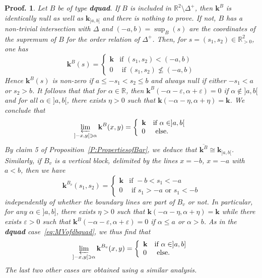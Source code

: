 \documentclass[a4paper, english, 11pt]{article}
\newcommand{\kk}[0]{\textbf{k}}
\newcommand{\0}{\vec{0}}
\newtheorem*{pf}{Proof.} }
\begin{document}
\begin{pf}
Let $B$ be of type \textbf{dquad}. If $B$ is included in $\mathbb{R}^2\setminus \Delta^+$, then $\kk^B$ is identically null as well as $\kk_{]a,b[}$ and there is nothing to prove. If not, $B$ has a non-trivial intersection with $\Delta$ and   $(-a,b)=\sup_{B}(s)$ are the coordinates of the supremum of $B$ for the order relation of $\Delta^+$. Then, for  $s=(s_1,s_2)\in \mathbb{R}^2_{>0}$, one has 
$$\kk^B(s) =\left\{ \begin{array}{ll} \kk & \mbox{if } (s_1,s_2)< (-a,b) \\
0 & \mbox{ if } (s_1, s_2) \not\leqslant (-a,b)\end{array}\right . $$ 
Hence $\kk^B(s)$ is non-zero  if $ a\leq -s_1 <s_2 \leq b$ and always null if either $-s_1<a$ or $s_2 >b$. It follows that 
that for $\alpha \in \mathbb{R}$, then $ \kk^B(-\alpha-\varepsilon, \alpha+\varepsilon) =0$ 
if $\alpha \notin ]a,b[$ and for all $\alpha \in ]a,b[$, there exists $\eta >0$ such that 
$\kk(-\alpha -\eta, \alpha+\eta) =\kk$. We conclude that
\begin{equation}\label{eq:MVofdbquad}\varprojlim_{]-x, y[ \ni \alpha} \kk^B(x,y) = \left\{ \begin{array}{ll} \kk & \mbox{if } \alpha \in ]a,b[ \\
0 & \mbox{ else. }\end{array}\right . 
 \end{equation}
By claim 5 of Proposition~\ref{P:PropertiesofBar}, we deduce that $\overline{\kk^B} \cong \kk_{]a,b[}$.
Similarly, 
 if $B_v$ is a vertical block, delimited by the lines $x=-b$, $x=-a$ with $a<b$, then we have
$$\kk^{B_v}(s_1, s_2) =\left\{ \begin{array}{ll} \kk & \mbox{if } -b<s_1< -a \\
0 & \mbox{ if } s_1 >-a \mbox{ or } s_1<-b \end{array}\right . $$
independently of whether the boundary lines are part of $B_v$ or not. In particular, for any  $\alpha \in ]a,b]$, there exists $\eta >0$ such that 
$\kk(-\alpha -\eta, \alpha+\eta) =\kk$ while there exists $\varepsilon >0$ such that
$ \kk^B(-\alpha-\varepsilon, \alpha+\varepsilon) =0$ if $\alpha \leq a$ or $\alpha >b$. 
As in the \textbf{dquad} case~\eqref{eq:MVofdbquad}, we thus find that 
\begin{equation*}\varprojlim_{]-x, y[ \ni \alpha} \kk^{B_v}(x,y) = \left\{ \begin{array}{ll} \kk & \mbox{if } \alpha \in ]a,b] \\
0 & \mbox{ else. }\end{array}\right . 
 \end{equation*}
 The last two other cases are obtained using a similar analysis. 
\end{pf}
\end{document}
